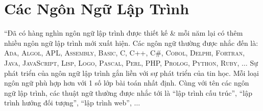 \documentclass[oneside]{book}
\numberwithin{equation}{section}
\begin{document}

\section{Các Ngôn Ngữ Lập Trình}
``Đã có hàng nghìn ngôn ngữ lập trình được thiết kế \& mỗi năm lại có thêm nhiều ngôn ngữ lập trình mới xuất hiện. Các ngôn ngữ thường được nhắc đến là: \textsc{Ada, Algol, APL, Assembly, Basic, C, C++, C\#, Cobol, Delphi, Fortran, Java, JavaScript, Lisp, Logo, Pascal, Perl, PHP, Prolog, Python, Ruby}, $\ldots$ Sự phát triển của ngôn ngữ lập trình gắn liền với sự phát triển của tin học. Mỗi loại ngôn ngữ phù hợp hơn với 1 số lớp bài toán nhất định. Cùng với tên các ngôn ngữ lập trình, các thuật ngữ thường được nhắc tới là ``lập trình cấu trúc'', ``lập trình hướng đối tượng'', ``lập trình web'', $\ldots$
\end{document}
